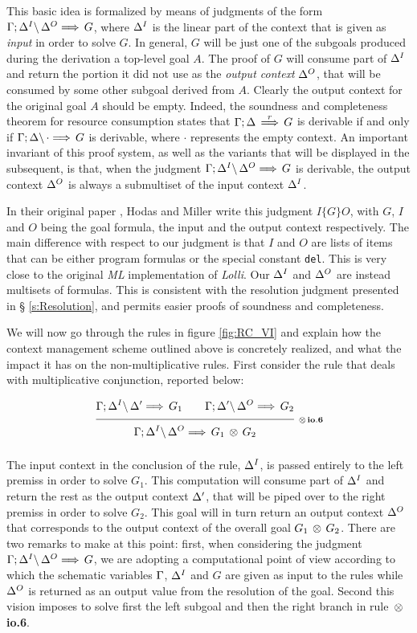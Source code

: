 This basic idea is formalized by means of judgments of the form
$\Gamma;\Delta^I \backslash \, \Delta^O \Longrightarrow \, G$, where $\Delta^I$ is the linear part of the context
that is given as {\em input\/} in order to solve $G$. In general, $G$ will be
just one of the subgoals produced during the derivation a top-level goal $A$.
The proof of $G$ will consume part of $\Delta^I$ and return the portion it did
not use as the {\em output context\/} $\Delta^O$, that will be consumed by some
other subgoal derived from $A$. Clearly the output context for the original
goal $A$ should be empty.  Indeed, the soundness and completeness theorem for
resource consumption states that $\Gamma;\Delta \, \stackrel{r}{\Longrightarrow} \, G$ is derivable if and
only if $\Gamma;\Delta \backslash \, \cdot \Longrightarrow \, G$ is derivable, where $\cdot$ represents
the empty context. An important invariant of this proof system, as well as
the variants that will be displayed in the subsequent, is that, when the
judgment $\Gamma;\Delta^I \backslash \, \Delta^O \Longrightarrow \, G$ is derivable, the output context $\Delta^O$ is
always a submultiset of the input context $\Delta^I$.

In their original paper \cite{HoM94}, Hodas and Miller write this judgment
$I\{G\}O$, with $G$, $I$ and $O$ being the goal formula, the input and the
output context respectively. The main difference with respect to our judgment
is that $I$ and $O$ are lists of items that can be either program formulas or
the special constant {\tt del}. This is very close to the original {\em ML\/}
implementation of {\em Lolli}. Our $\Delta^I$ and $\Delta^O$ are instead multisets of
formulas. This is consistent with the resolution judgment presented in \S
\ref{s:Resolution}, and permits easier proofs of soundness and completeness.

We will now go through the rules in figure \ref{fig:RC_VI} and explain how
the context management scheme outlined above is concretely realized, and what
the impact it has on the non-multiplicative rules. First consider the rule that
deals with multiplicative conjunction, reported below:

$$\ruleII
  {\ioVI{\G;\D^I}{\D'}{G_1}}
  {\ioVI{\G;\D'}{\D^O}{G_2}}
  {\ioVI{\G;\D^I}{\D^O}{G_1 \Times G_2}}
  {\Times io.6}
$$

\noindent
The input context in the conclusion of the rule, $\Delta^I$, is passed entirely
to the left premiss in order to solve $G_1$. This computation will consume
part of $\Delta^I$ and return the rest as the output context $\Delta'$, that will be
piped over to the right premiss in order to solve $G_2$. This goal will in
turn return an output context $\Delta^O$ that corresponds to the output context
of the overall goal $G_1 \, \otimes \, G_2$. There are two remarks to make at this
point: first, when considering the judgment $\Gamma;\Delta^I \backslash \, \Delta^O \Longrightarrow \, G$, we are
adopting a computational point of view according to which the schematic
variables $\Gamma$, $\Delta^I$ and $G$ are given as input to the rules while $\Delta^O$
is returned as an output value from the resolution of the goal.  Second this
vision imposes to solve first the left subgoal and then the right branch in
rule {\bf $\, \otimes \,$ io.6}.

